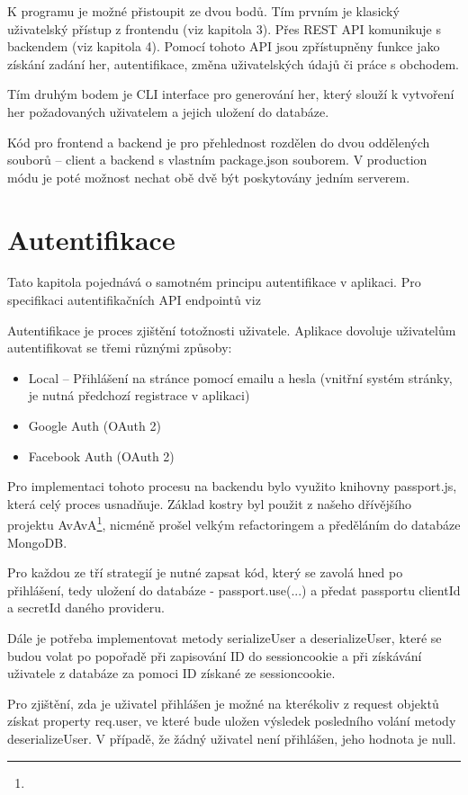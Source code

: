 \documentclass[a4paper,oneside,12pt]{report}
\begin{document}
K programu je možné přistoupit ze dvou bodů. Tím prvním je klasický uživatelský přístup z frontendu (viz kapitola 3). Přes REST API komunikuje s backendem (viz kapitola 4). Pomocí tohoto API jsou zpřístupněny funkce jako získání zadání her, autentifikace, změna uživatelských údajů či práce s obchodem.

Tím druhým bodem je CLI interface pro generování her, který slouží k vytvoření her požadovaných uživatelem a jejich uložení do databáze.

Kód pro frontend a backend je pro přehlednost rozdělen do dvou oddělených souborů -- client a backend s vlastním package.json souborem. V production módu je poté možnost nechat obě dvě být poskytovány jedním serverem.

\section{Autentifikace}

Tato kapitola pojednává o samotném principu autentifikace v aplikaci. Pro specifikaci autentifikačních API endpointů viz 

Autentifikace je proces zjištění totožnosti uživatele. Aplikace dovoluje uživatelům autentifikovat se třemi různými způsoby:
\begin{itemize}
   \item Local -- Přihlášení na stránce pomocí emailu a hesla (vnitřní systém stránky, je nutná předchozí registrace v aplikaci)
   \item Google Auth (OAuth 2)
   \item Facebook Auth (OAuth 2)
\end{itemize}
Pro implementaci tohoto procesu na backendu bylo využito knihovny passport.js, která celý proces usnadňuje. Základ kostry byl použit z našeho dřívějšího projektu AvAvA\footnote{}, nicméně prošel velkým refactoringem a předěláním do databáze MongoDB.

Pro každou ze tří strategií je nutné zapsat kód, který se zavolá hned po přihlášení, tedy uložení do databáze - passport.use(...) a předat passportu clientId a secretId daného provideru.

Dále je potřeba implementovat metody serializeUser a deserializeUser, které se budou volat po popořadě při zapisování ID do sessioncookie a při získávání uživatele z databáze za pomoci ID získané ze sessioncookie.

Pro zjištění, zda je uživatel přihlášen je možné na kterékoliv z request objektů získat property req.user, ve které bude uložen výsledek posledního volání metody deserializeUser. V případě, že žádný uživatel není přihlášen, jeho hodnota je null.
\end{document}
